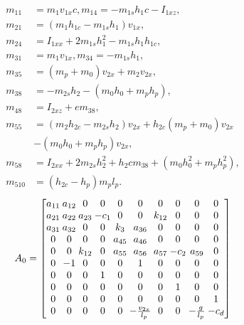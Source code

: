 \begin{equation}
\begin{aligned}
m_{11} &= m_1 v_{1x} c, m_{14} = -m_{1s} h_1 c - I_{1xz}, \\
m_{21} &= (m_1 h_{1c} - m_{1s} h_1) v_{1x}, \\
m_{24} &= I_{1xx} + 2m_{1s} h_1^2 - m_{1s} h_1 h_{1c}, \\
m_{31} &= m_1 v_{1x}, m_{34} = -m_{1s} h_1, \\
m_{35} &= (m_p + m_0) v_{2x} + m_2 v_{2x}, \\
m_{38} &= -m_{2s} h_2 - (m_0 h_0 + m_p h_p), \\
m_{48} &= I_{2xz} + em_{38}, \\
m_{55} &= (m_2 h_{2c} - m_{2s} h_2) v_{2x} + h_{2c}(m_p + m_0) v_{2x} \\
       & - (m_0 h_0 + m_p h_p) v_{2x}, \\
m_{58} &= I_{2xx} + 2m_{2s} h_2^2 + h_2 c m_{38} + (m_0 h_0^2 + m_p h_p^2), \\
m_{510} &= (h_{2c} - h_p) m_p l_p.\nonumber
\end{aligned}\nonumber
\end{equation}
\vspace{-0.2cm}
\begin{equation}
\setlength{\arraycolsep}{1.2pt}
A_{0} = \begin{bmatrix}
a_{11} & a_{12} & 0 & 0 & 0 & 0 & 0 & 0 & 0 & 0 \\
a_{21} & a_{22} & a_{23} & {- c_{1}} & 0 & 0 & k_{12} & 0 & 0 & 0 \\
a_{31} & a_{32} & 0 & 0 & k_{3} & a_{36} & 0 & 0 & 0 & 0 \\
0 & 0 & 0 & 0 & a_{45} & a_{46} & 0 & 0 & 0 & 0 \\
0 & 0 & k_{12} & 0 & a_{55} & a_{56} & a_{57} & {- c_{2}} & a_{59} & 0 \\
0 & {- 1} & 0 & 0 & 0 & 1 & 0 & 0 & 0 & 0 \\
0 & 0 & 0 & 1 & 0 & 0 & 0 & 0 & 0 & 0 \\
0 & 0 & 0 & 0 & 0 & 0 & 0 & 1 & 0 & 0 \\
0 & 0 & 0 & 0 & 0 & 0 & 0 & 0 & 0 & 1 \\
0 & 0 & 0 & 0 & 0 & {- \frac{v_{2x}}{l_{p}}} & 0 & 0 & {- \frac{g}{l_{p}}} & {- c_{d}}
\end{bmatrix}\nonumber
\end{equation}
\vspace{-1cm}


